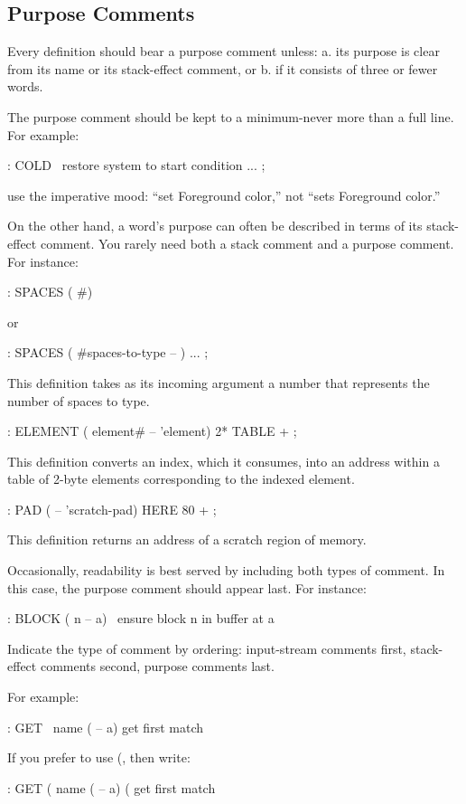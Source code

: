 \subsection{Purpose Comments}

\begin{tip}
Every definition should bear a purpose comment unless:
a. its purpose is clear from its name or its stack-effect comment, or
b. if it consists of three or fewer words.
\end{tip}

The purpose comment should be kept to a minimum-never more than a
full line.  For example:
\begin{Code}
: COLD \ restore system to start condition
   ... ;
\end{Code}
use the imperative mood: ``set Foreground color,'' not ``sets Foreground
color.''

On the other hand, a word's purpose can often be described in terms
of its stack-effect comment.  You rarely need both a stack comment and a
purpose comment.  For instance:
\begin{Code}
: SPACES ( #)
\end{Code}
or
\begin{Code}
: SPACES  ( #spaces-to-type -- )  ... ;
\end{Code}

This definition takes as its incoming argument a number that represents
the number of spaces to type.
\begin{Code}
: ELEMENT  ( element# -- 'element)  2*  TABLE + ;
\end{Code}
This definition converts an index, which it consumes, into an address
within a table of 2-byte elements corresponding to the indexed element.
\begin{Code}
: PAD ( -- 'scratch-pad)  HERE 80 + ;
\end{Code}
This definition returns an address of a scratch region of memory.

Occasionally, readability is best served by including both types of
comment.  In this case, the purpose comment should appear last.  For
instance:
\begin{Code}
: BLOCK  ( n -- a)  \  ensure block n in buffer at a
\end{Code}

\begin{tip}
Indicate the type of comment by ordering: input-stream comments first,
stack-effect comments second, purpose comments last.
\end{tip}
For example:
\begin{Code}
: GET  \  name  ( -- a)   get first match
\end{Code}
If you prefer to use (, then write:
\begin{Code}
: GET  (  name  ( -- a) ( get first match
\end{Code}

